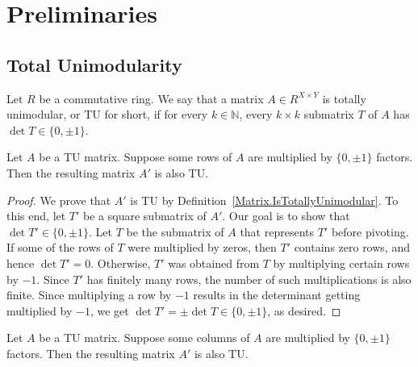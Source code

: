 \chapter{Preliminaries}

\section{Total Unimodularity}

\begin{definition}
    \label{Matrix.IsTotallyUnimodular}
    \leanok
    Let $R$ be a commutative ring. We say that a matrix $A \in R^{X \times Y}$ is totally unimodular, or TU for short, if for every $k \in \mathbb{N}$, every $k \times k$ submatrix $T$ of $A$ has $\det T \in \{0, \pm 1\}$.
\end{definition}

\begin{lemma}
    \label{Matrix.IsTotallyUnimodular.mul_rows}
    \leanok
    Let $A$ be a TU matrix. Suppose some rows of $A$ are multiplied by $\{0, \pm 1\}$ factors. Then the resulting matrix $A'$ is also TU.
\end{lemma}

\begin{proof}
    \leanok
    We prove that $A'$ is TU by Definition~\ref{Matrix.IsTotallyUnimodular}. To this end, let $T'$ be a square submatrix of $A'$. Our goal is to show that $\det T' \in \{0, \pm 1\}$. Let $T$ be the submatrix of $A$ that represents $T'$ before pivoting. If some of the rows of $T$ were multiplied by zeros, then $T'$ contains zero rows, and hence $\det T' = 0$. Otherwise, $T'$ was obtained from $T$ by multiplying certain rows by $-1$. Since $T'$ has finitely many rows, the number of such multiplications is also finite. Since multiplying a row by $-1$ results in the determinant getting multiplied by $-1$, we get $\det T' = \pm \det T \in \{0, \pm 1\}$, as desired.
\end{proof}

\begin{lemma}
    \label{Matrix.IsTotallyUnimodular.mul_cols}
    \leanok
    Let $A$ be a TU matrix. Suppose some columns of $A$ are multiplied by $\{0, \pm 1\}$ factors. Then the resulting matrix $A'$ is also TU.
\end{lemma} %

